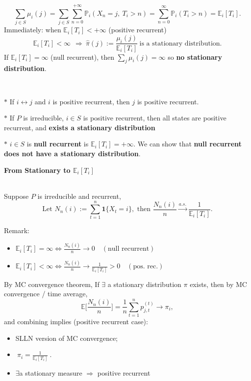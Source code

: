 \documentclass[a4paper, landscape]{article}
\newcommand{\topic}[1]{\par\medskip\textbf{#1}\par}
\newcommand{\subtopic}[1]{\par\textbf{#1}}
\renewcommand{\topic}[1]{\par\medskip\noindent\colorbox{highlightcolor}{\parbox{\dimexpr\columnwidth-2\fboxsep\relax}{\textbf{#1}}}\par}
\renewcommand{\subtopic}[1]{\par\textbf{\color{blue}{#1}}} %
\begin{document}
\begin{multicols}{4}
\subtopic{Step 2: when does $\mu$ become a stat distri?}

\[
\sum_{j\in S}\mu_i(j)=\sum_{j\in S}\sum_{n=0}^{+\infty} \mathbb P_i(X_n=j,\ T_i>n)
=\sum_{n=0}^\infty \mathbb P_i(T_i>n)=\mathbb E_i[T_i].
\]
Immediately: when $\mathbb E_i[T_i]<+\infty$ (positive recurrent)
\[
\mathbb E_i[T_i]<\infty\
\ \Longrightarrow\
\hat\pi(j):=\frac{\mu_i(j)}{\mathbb E_i[T_i]}
\ \text{is a stationary distribution}.
\]
If $\mathbb E_i[T_i]=\infty$ (null recurrent), then $\sum_j\mu_i(j)=\infty$ so \textbf{no stationary distribution}.

\subtopic{Structural properties (irreducible chains)}\\
\par $*$ If $i\leftrightarrow j$ and $i$ is positive recurrent, then $j$ is positive recurrent.
\par $*$ If $P$ is irreducible, $i\in S$ is positive recurrent, then all states are positive recurrent, and \textbf{exists a stationary distribution}
\par $*$ $i\in S$ is \textbf{null recurrent} is $\mathbb E_i[T_i]=+\infty$. We can show that \textbf{null recurrent does not have a stationary distribution}.

\vspace{3cm}

\topic{From Stationary to $\mathbb E_i[T_i]$}
\subtopic{Theorem: Number of returns  (linking $\pi$ and $\mathbb E_i[T_i]$)}\\
Suppose $P$ is irreducible and recurrent,
\[
\text{Let } N_n(i):=\sum_{t=1}^n \mathbf 1\{X_t=i\}, \text{ then }\frac{N_n(i)}{n}\xrightarrow{a.s.}\frac{1}{\mathbb E_i[T_i]}.
\]

Remark:
\begin{itemize}
    \item $\mathbb E_i[T_i]=\infty\iff \frac{N_n(i)}{n}\to 0\quad(\text{null recurrent})$
    \item $\mathbb E_i[T_i]<\infty\iff \frac{N_n(i)}{n}\to \frac{1}{\mathbb E_i[T_i]}>0\quad(\text{pos. rec.})$
\end{itemize}

\subtopic{Theorem: $\Big[\frac{N_n(i)}{n}\Big]$ convergence:}
By MC convergence theorem, If $\exists$ a stationary distribution $\pi$ exists, then by MC convergence / time average,
\[
\mathbb E\Big[\frac{N_n(i)}{n}\Big]=\frac1n\sum_{t=1}^n p_{j,t}^{(t)}\to \pi_i,
\]
and combining implies (positive recurrent case):
\begin{itemize}
    \item SLLN version of MC convergence;
    \item $\boxed{\ \pi_i=\frac{1}{\mathbb E_i[T_i]}\ }.$
    \item $\exists$a stationary measure $\Rightarrow$ positive recurrent
\end{itemize}


\end{multicols}
\end{document}
